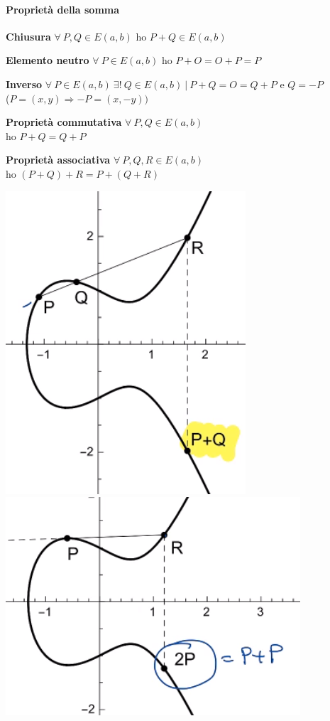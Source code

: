 \documentclass[10pt]{book}
\begin{document}
\begin{multicols}{2}
\paragraph{Proprietà della somma}
\begin{list}{}{}
	\item \textbf{Chiusura} $\forall\:P,Q\in E(a,b)$ ho $P + Q \in E(a,b)$
	\item \textbf{Elemento neutro} $\forall\:P\in E(a,b)$ ho $P + O = O + P = P$
	\item \textbf{Inverso} $\forall\:P\in E(a,b)\:\exists!\:Q\in E(a,b)\:|\: P + Q = O = Q + P$ e $Q = -P$\\($P = (x,y)\Rightarrow -P = (x, -y))$
	\item \textbf{Proprietà commutativa} $\forall\:P,Q\in E(a,b)$\\ho $P + Q = Q + P$
	\item \textbf{Proprietà associativa} $\forall\:P,Q,R\in E(a,b)$\\ho $(P + Q) + R = P + (Q + R)$
\end{list}
\columnbreak
\begin{center}
	\includegraphics[scale=0.5]{15.png}\\
	\includegraphics[scale=0.5]{16.png}
\end{center}
\end{multicols}
\end{document}
